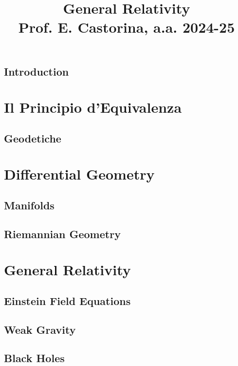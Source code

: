 \documentclass[a4paper, 12pt, openany]{book}
\title{\Huge\textbf{General Relativity} \\ \large Prof. E. Castorina, a.a. 2024-25}
\begin{document}
\frontmatter

\maketitle

\tableofcontents
\pagestyle{contents}

\mainmatter

\chapter*{Introduction}
\pagestyle{introd}



\part{Il Principio d'Equivalenza}
\pagestyle{body}

\chapter{Geodetiche}


\part{Differential Geometry}

\chapter{Manifolds}


\chapter{Riemannian Geometry}


\part{General Relativity}

\chapter{Einstein Field Equations}


\chapter{Weak Gravity}


\chapter{Black Holes}

\end{document}

